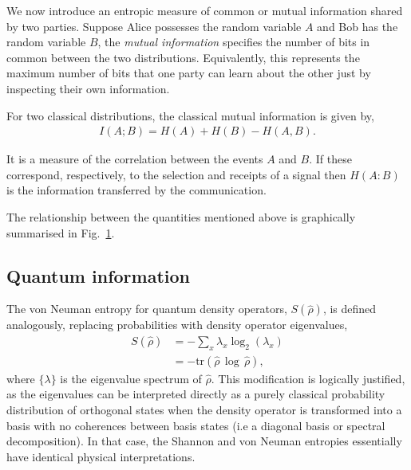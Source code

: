 \begin{figure}[!hbtp]
	\captionspacefig \caption{}\label{fig:mutual_info}	
\end{figure}


We now introduce an entropic measure of common or mutual information shared by two parties. Suppose Alice possesses the random variable $A$ and Bob has the random variable $B$, the \textit{mutual information} specifies the number of bits in common between the two distributions. Equivalently, this represents the maximum number of bits that one party can learn about the other just by inspecting their own information.

For two classical distributions, the classical mutual information is given by,
\begin{align}
	I(A;B) = H(A) + H(B) - H(A,B).
\end{align}

It is a measure of the correlation between the events $A$ and $B$. If these correspond, respectively, to the selection and receipts of a signal then \mbox{$H(A:B)$} is the information transferred by the communication. 

The relationship between the quantities mentioned above is graphically summarised in Fig.~\ref{fig:mutual_info}.


\subsection{Quantum information}

The von Neuman entropy \cite{bib:bengtsson2017geometry} for quantum density operators, $S(\hat\rho)$, is defined analogously, replacing probabilities with density operator eigenvalues,
\begin{align}
S(\hat\rho) &= - \sum_x \lambda_x \log_2 (\lambda_x) \nonumber \\
&= -\mathrm{tr}(\hat\rho\,\log \,\hat\rho),
\end{align}
where $\{\lambda\}$ is the eigenvalue spectrum of $\hat\rho$. This modification is logically justified, as the eigenvalues can be interpreted directly as a purely classical probability distribution of orthogonal states when the density operator is transformed into a basis with no coherences between basis states (i.e a diagonal basis or spectral decomposition). In that case, the Shannon and von Neuman entropies essentially have identical physical interpretations.

